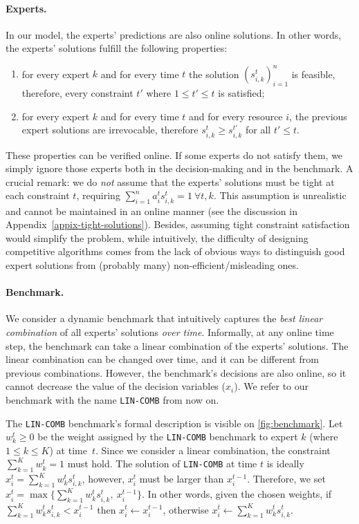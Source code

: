 \paragraph{Experts.} \label{subsec:experts} In our model, the experts' predictions are also online solutions. In other words, the experts' solutions
fulfill the following properties:
\begin{enumerate}
	\item for every expert $k$ and for every time $t$ the solution $(s_{i,k}^{t})_{i=1}^{n}$ is feasible, therefore, every constraint $t'$ where $1 \leq t' \leq t$ is satisfied;
	\item for every expert $k$ and for every time $t$ and for every resource $i$, the previous expert solutions are irrevocable, therefore $s_{i,k}^{t} \geq s_{i,k}^{t'}$ for all $t' \leq t$.
\end{enumerate}
These properties can be verified online. If some experts do not satisfy them, we simply ignore those experts both in the decision-making and in the benchmark.
A crucial remark: we do \emph{not} assume that the experts' solutions must be tight at each constraint $t$, requiring $\sum_{i=1}^{n} a_{i}^{t} s_{i,k}^{t} = 1 ~ \forall t, k$.
This assumption is unrealistic and cannot be maintained in an online manner (see the discussion in Appendix~\ref{appix-tight-solutions}).
Besides, assuming tight constraint satisfaction would simplify the problem, while intuitively,
the difficulty of designing competitive algorithms comes from the lack of obvious ways to distinguish
good expert solutions from (probably many) non-efficient/misleading ones.

\paragraph{Benchmark.}
We consider a dynamic benchmark that intuitively captures the \emph{best linear combination} of all experts' solutions \emph{over time}.
Informally, at any online time step, the benchmark can take a linear combination of the experts' solutions.
The linear combination can be changed over time, and it can be different from previous combinations.
However, the benchmark's decisions are also online, so it cannot decrease the value of the decision variables ($x_{i}$).
We refer to our benchmark with the name \texttt{LIN-COMB} from now on.

The \texttt{LIN-COMB} benchmark's formal description is visible on \cref{fig:benchmark}.
Let $w_{k}^{t} \geq 0$ be the weight assigned by the \texttt{LIN-COMB} benchmark to expert $k$ (where $1 \leq k \leq K$) at time~$t$.
Since we consider a linear combination, the constraint $ \sum_{k=1}^{K} w_{k}^{t} = 1$ must hold.
The solution of \texttt{LIN-COMB} at time $t$ is ideally $x_{i}^{t} = \sum_{k=1}^{K} w_{k}^{t} s_{i,k}^{t}$,
however, $x_{i}^{t}$ must be larger than $x_{i}^{t-1}$.
Therefore, we set $x_{i}^{t} = \max\bigl\{\sum_{k=1}^{K} w_{k}^{t} s_{i,k}^{t},\ x_{i}^{t-1}\bigr\}$.
In other words, given the chosen weights, if  $\sum_{k=1}^{K} w_{k}^{t} s_{i,k}^{t} < x_{i}^{t-1}$ then $x_{i}^{t} \gets x_{i}^{t-1}$,
otherwise $x_{i}^{t} \gets \sum_{k=1}^{K} w_{k}^{t} s_{i,k}^{t}$.

